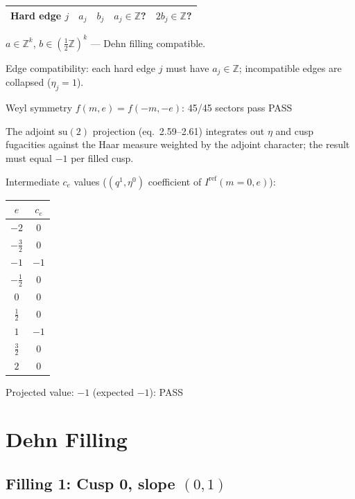 \documentclass[11pt,a4paper]{article}
\newcommand{\Iref}{I^{\mathrm{ref}}}
\newcommand{\passmark}{\textcolor{pass}{PASS}}
\begin{document}
\begin{center}
\begin{tabular}{c c c c c}
\toprule
Hard edge $j$ & $a_j$ & $b_j$ & $a_j \in \mathbb{Z}$? & $2b_j \in \mathbb{Z}$? \\ \midrule
\bottomrule
\end{tabular}
\end{center}

{\color{pass} $a \in \mathbb{Z}^k$, $b \in (\tfrac{1}{2}\mathbb{Z})^k$ — Dehn filling compatible.}

Edge compatibility: each hard edge $j$ must have $a_j \in \mathbb{Z}$; incompatible edges are collapsed ($\eta_j = 1$).


Weyl symmetry $f(m,e)=f(-m,-e)$: 45/45 sectors pass \passmark

The adjoint $\mathrm{su}(2)$ projection (eq.~2.59--2.61) integrates out $\eta$ and cusp fugacities against the Haar measure weighted by the adjoint character; the result must equal $-1$ per filled cusp.

Intermediate $c_e$ values ($(q^1, \eta^0)$ coefficient of $\Iref(m=0, e)$):
\begin{center}
\begin{tabular}{c c}
\toprule
$e$ & $c_e$ \\ \midrule
  $-2$ & $0$ \\
  $-\tfrac{3}{2}$ & $0$ \\
  $-1$ & $-1$ \\
  $-\tfrac{1}{2}$ & $0$ \\
  $0$ & $0$ \\
  $\tfrac{1}{2}$ & $0$ \\
  $1$ & $-1$ \\
  $\tfrac{3}{2}$ & $0$ \\
  $2$ & $0$ \\
\bottomrule
\end{tabular}
\end{center}

Projected value: $-1$ (expected $-1$): \passmark

\section{Dehn Filling}

\subsection{Filling 1: Cusp 0, slope $(0, 1)$}
\end{document}
